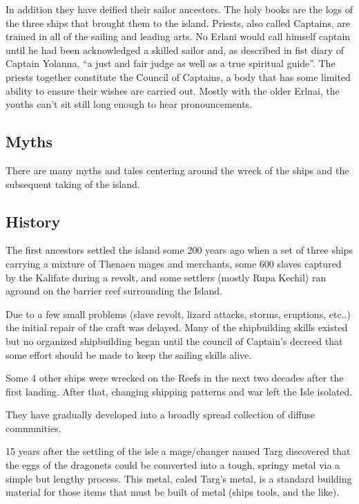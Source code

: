 In addition they have deified their sailor ancestors. The holy books
are the logs of the three ships that brought them to the island.
Priests, also called Captains, are trained in all of the sailing
and leading arts. No Erlani would call himself captain until he had
been acknowledged a skilled sailor and, as described in fist diary of
Captain Yolanna, ``a just and fair judge as well as a true spiritual guide''.
The priests together constitute the Council of Captains, a body that 
has some limited ability to ensure their wishes are carried out. Mostly
with the older Erlnai, the youths can't sit still long enough to 
hear pronouncements.

\subsection{Myths}

There are many myths and tales centering around the wreck of the 
ships and the subsequent taking of the island. 

\subsection{History}

The first ancestors settled the island some 200 years ago when a set of 
three ships carrying a mixture of Thenaen mages and merchants, some 600 
slaves captured by the Kalifate during a revolt, and some settlers (mostly 
Rupa Kechil) ran aground on the barrier reef surrounding the Island.

Due to a few small problems (slave revolt, lizard attacks, storms, eruptions, etc..) 
the initial repair of the craft was delayed. Many of the shipbuilding skills 
existed but no organized shipbuilding began until the council of Captain's decreed 
that some effort should be made to keep the sailing skills alive. 

Some 4 other ships were wrecked on the Reefs in the next two decades
after the first landing. After that, changing shipping patterns and war
left the Isle isolated. 

They have gradually developed into a broadly spread collection of 
diffuse communities. 

15 years after the settling of the isle a mage/changer named Targ discovered 
that the eggs of
the dragonets could be comverted into a tough, springy metal via a simple but 
lengthy process.
This metal, caled Targ's metal, is a standard building material for those items 
that must be 
built of metal (ships tools, and the like).

